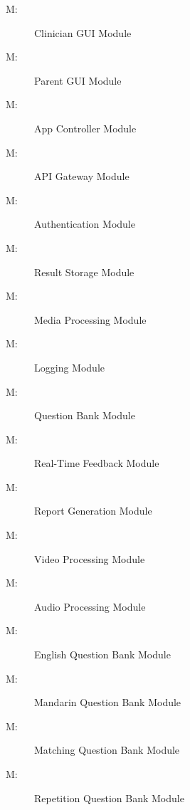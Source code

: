 \documentclass[12pt, titlepage]{article}
\newcounter{mnum}
\newcommand{\mthemnum}{M\themnum}
\begin{document}
\begin{multicols}{2}
  \begin{description}
    \item [ \mthemnum \label{mClinicianGUI}:] Clinician GUI Module
    \item [ \mthemnum \label{mParentGUI}:] Parent GUI Module
    \item [ \mthemnum \label{mAppController}:] App Controller Module
    \item [ \mthemnum \label{mAPIGateway}:] API Gateway Module
    \item [ \mthemnum \label{mAuth}:] Authentication Module
    \item [ \mthemnum \label{mResultStorage}:] Result Storage Module
    \item [ \mthemnum \label{mMediaProcessing}:] Media Processing Module
    \item [ \mthemnum \label{mLogging}:] Logging Module
    \item [ \mthemnum \label{mQuestionBank}:] Question Bank Module
    \item [ \mthemnum \label{mRealTimeFeedback}:] Real-Time Feedback Module
    \item [ \mthemnum \label{mReportGeneration}:] Report Generation Module
    \item [ \mthemnum \label{mVideoProcessing}:] Video Processing Module
    \item [ \mthemnum \label{mAudioProcessing}:] Audio Processing Module
    \item [ \mthemnum \label{mEnglishBank}:] English Question Bank Module
    \item [ \mthemnum \label{mMandarinBank}:] Mandarin Question Bank Module
    \item [ \mthemnum \label{mMatchingBank1}:] Matching Question Bank Module 
    \item [ \mthemnum \label{mRepetitionBank1}:] Repetition Question Bank Module
  \end{description}
  \end{multicols}
  
\end{document}
